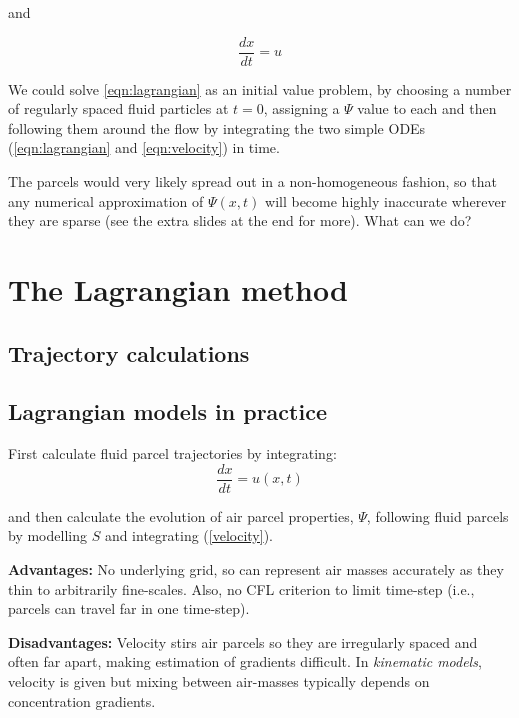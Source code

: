 and

\begin{definition}[velocity]
		\begin{equation}
\frac {d x}{d t} = u
\label{eqn:velocity}
\end{equation}
\end{definition}

We could solve \ref{eqn:lagrangian} as an initial value problem, by choosing a number of regularly spaced fluid particles at $t=0$, assigning a $\Psi$ value to each and then following them around the flow by integrating the two simple ODEs (\ref{eqn:lagrangian} and \ref{eqn:velocity}) in time.\\

\begin{exercise}
The parcels would very likely spread out in a non-homogeneous fashion, so that any numerical approximation of $\Psi(x,t)$ will become highly inaccurate wherever they are sparse (see the extra slides at the end for more). What can we do?
\end{exercise}

\section{The Lagrangian method}
\subsection{Trajectory calculations}
\subsection{Lagrangian models in practice}

\setcounter{equation}{2}	
	First calculate fluid parcel trajectories by
	integrating:
	\begin{equation}
	\frac{{d x}}{d t}={ u}({ x},t)
	\label{velocity}	
	\end{equation}
	
	and then calculate the evolution of air parcel properties, $\Psi$,
	following fluid parcels by modelling $S$ and integrating
	(\ref{velocity}).
	

	{\bf Advantages:} No underlying grid, so can represent air masses
	accurately as they thin to arbitrarily fine-scales. Also, no CFL
	criterion to limit time-step (i.e., parcels can travel far in one
	time-step).
	

	{\bf Disadvantages:} Velocity stirs air parcels so they are
	irregularly spaced and often far apart, making estimation of gradients
	difficult. In {\em kinematic models}, velocity is given but mixing
	between air-masses typically depends on concentration gradients. 
	


